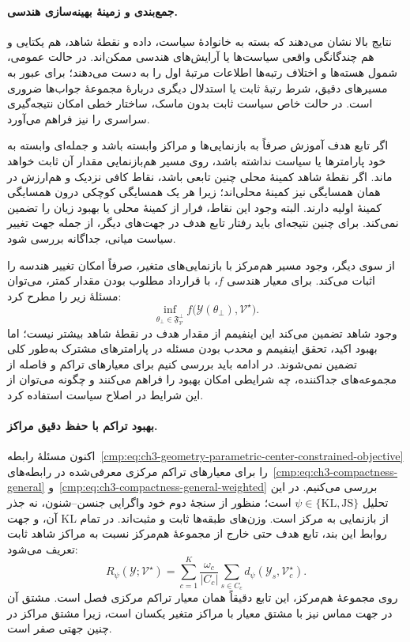 \paragraph{جمع‌بندی و زمینهٔ بهینه‌سازی هندسی.}
نتایج بالا نشان می‌دهند که بسته به خانوادهٔ سیاست، داده و نقطهٔ شاهد، هم یکتایی و هم چندگانگی واقعی سیاست‌ها یا آرایش‌های هندسی ممکن‌اند. در حالت عمومی، شمول هسته‌ها و اختلاف رتبه‌ها اطلاعات مرتبهٔ اول را به دست می‌دهند؛ برای عبور به مسیرهای دقیق، شرط رتبهٔ ثابت یا استدلال دیگری دربارهٔ مجموعهٔ جواب‌ها ضروری است. در حالت خاص سیاست ثابت بدون ماسک، ساختار خطی امکان نتیجه‌گیری سراسری را نیز فراهم می‌آورد.

اگر تابع هدف آموزش صرفاً به بازنمایی‌ها و مراکز وابسته باشد و جمله‌ای وابسته به خود پارامترها یا سیاست نداشته باشد، روی مسیر هم‌بازنمایی مقدار آن ثابت خواهد ماند. اگر نقطهٔ شاهد کمینهٔ محلی چنین تابعی باشد، نقاط کافی نزدیک و هم‌ارزش در همان همسایگی نیز کمینهٔ محلی‌اند؛ زیرا هر یک همسایگی کوچکی درون همسایگی کمینهٔ اولیه دارند. البته وجود این نقاط، فرار از کمینهٔ محلی یا بهبود زیان را تضمین نمی‌کند. برای چنین نتیجه‌ای باید رفتار تابع هدف در جهت‌های دیگر، از جمله جهت تغییر سیاست میانی، جداگانه بررسی شود.

از سوی دیگر، وجود مسیر هم‌مرکز با بازنمایی‌های متغیر، صرفاً امکان تغییر هندسه را اثبات می‌کند. برای معیار هندسی $f$، با قرارداد مطلوب بودن مقدار کمتر، می‌توان مسئلهٔ زیر را مطرح کرد:
\begin{equation}\label{cmp:eq:ch3-geometry-parametric-center-constrained-objective}
\inf_{\theta_\bot\in\mathfrak F_{\mathcal V}^\bot}
 f\bigl(\mathscr Y(\theta_\bot),\mathcal V^\star\bigr).
\end{equation}
وجود شاهد تضمین می‌کند این اینفیمم از مقدار هدف در نقطهٔ شاهد بیشتر نیست؛ اما بهبود اکید، تحقق اینفیمم و محدب بودن مسئله در پارامترهای مشترک به‌طور کلی تضمین نمی‌شوند. در ادامه باید بررسی کنیم برای معیارهای تراکم و فاصله از مجموعه‌های جداکننده، چه شرایطی امکان بهبود را فراهم می‌کنند و چگونه می‌توان از این شرایط در اصلاح سیاست استفاده کرد.

\paragraph{بهبود تراکم با حفظ دقیق مراکز.}
اکنون مسئلهٔ رابطه~\eqref{cmp:eq:ch3-geometry-parametric-center-constrained-objective} را برای معیارهای تراکم مرکزی معرفی‌شده در رابطه‌های~\eqref{cmp:eq:ch3-compactness-general} و~\eqref{cmp:eq:ch3-compactness-general-weighted} بررسی می‌کنیم. در این تحلیل $\psi\in\{\mathrm{KL},\mathrm{JS}\}$ است؛ منظور از سنجهٔ دوم خود واگرایی جنسن--شنون، نه جذر آن، و جهت KL از بازنمایی به مرکز است. وزن‌های طبقه‌ها ثابت و مثبت‌اند. در تمام روابط این بند، تابع هدف حتی خارج از مجموعهٔ هم‌مرکز نسبت به مراکز شاهد ثابت تعریف می‌شود:
\begin{equation}\label{cmp:eq:ch3-geometry-parametric-fixed-center-R}
R_\psi(\mathscr Y;\mathcal V^\star)
=\sum_{c=1}^K\frac{\omega_c}{|C_c|}
\sum_{s\in C_c}d_\psi(\mathscr Y_s,\mathcal V_c^\star).
\end{equation}
روی مجموعهٔ هم‌مرکز، این تابع دقیقاً همان معیار تراکم مرکزی فصل است. مشتق آن در جهت مماس نیز با مشتق معیار با مراکز متغیر یکسان است، زیرا مشتق مراکز در چنین جهتی صفر است.

